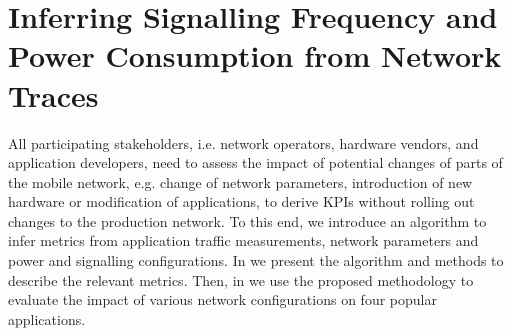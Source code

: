 \section{Inferring Signalling Frequency and Power Consumption from Network Traces}\label{sec:network:network_traces}
All participating stakeholders, i.e. network operators, hardware vendors, and application developers, need to assess the impact of potential changes of parts of the mobile network, e.g. change of network parameters, introduction of new hardware or modification of applications, to derive \glspl{KPI} without rolling out changes to the production network.
To this end, we introduce an algorithm to infer metrics from application traffic measurements, network parameters and power and signalling configurations.
In  we present the algorithm and methods to describe the relevant metrics.
Then, in  we use the proposed methodology to evaluate the impact of various network configurations on four popular applications.
  


